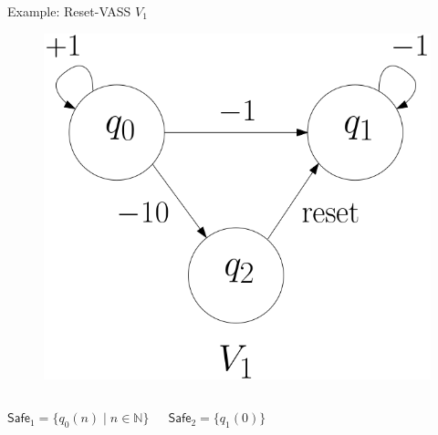 \documentclass{beamer}
\newcommand{\N}{\mathbb{N}}
\newcommand{\Safe}{\textsf{Safe}}
\begin{document}
  \begin{frame}{Example: Reset-VASS $V_1$}
  
  
   \begin{center}
 	\begin{figure}
 	\vspace{.06cm}
\includegraphics[width=.47\textwidth]{FigA}
	\end{figure}
\end{center}  


\begin{columns}[T]

$\Safe_1 = \{q_0(n) \mid n \in \N\}$

\vspace{0.1cm}

$\Safe_2 = \{q_1(0)\} $




 

\vspace{0.1cm}


\end{columns}


  \end{frame}
\end{document}

